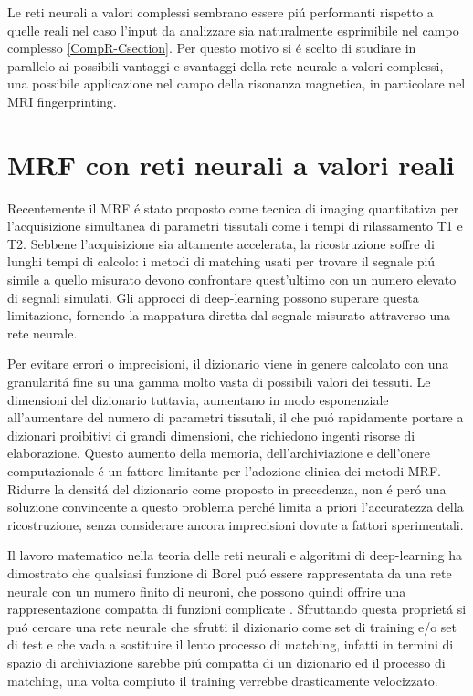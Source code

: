 \documentclass[a4paper,12pt]{report}
\begin{document}
 Le reti neurali a valori complessi sembrano essere pi\'u performanti rispetto a quelle reali nel caso l'input da analizzare sia naturalmente esprimibile nel campo complesso \ref{CompR-Csection}. Per questo motivo si \'e scelto di studiare in parallelo ai possibili vantaggi e svantaggi della rete neurale a valori complessi, una possibile applicazione nel campo della risonanza magnetica, in particolare nel MRI fingerprinting.
 
 \section{MRF con reti neurali a valori reali}
 
 Recentemente il MRF \'e stato proposto come tecnica di imaging quantitativa per l'acquisizione simultanea di parametri tissutali come i tempi di rilassamento T1 e T2. Sebbene l'acquisizione sia altamente accelerata, la ricostruzione soffre di lunghi tempi di calcolo: i metodi di matching usati per trovare il segnale pi\'u simile a quello misurato devono confrontare quest'ultimo con un numero elevato di segnali simulati. Gli approcci di deep-learning possono superare questa limitazione, fornendo la mappatura diretta dal segnale misurato attraverso una rete neurale. 
 
 Per evitare errori o imprecisioni, il dizionario viene in genere calcolato con una granularit\'a fine su una gamma molto vasta di possibili valori dei tessuti. Le dimensioni del dizionario tuttavia, aumentano in modo esponenziale all'aumentare del numero di parametri tissutali, il che pu\'o rapidamente portare a dizionari proibitivi di grandi dimensioni, che richiedono ingenti risorse di elaborazione. Questo aumento della memoria, dell'archiviazione e dell'onere computazionale \'e un fattore limitante per l'adozione clinica dei metodi MRF. Ridurre la densit\'a del dizionario come proposto in precedenza, non \'e per\'o una soluzione convincente a questo problema perch\'e limita a priori l'accuratezza della ricostruzione, senza considerare ancora imprecisioni dovute a fattori sperimentali. 
 
 Il lavoro matematico nella teoria delle reti neurali e algoritmi di deep-learning ha dimostrato che qualsiasi funzione di Borel pu\'o essere rappresentata da una rete neurale con un numero finito di neuroni, che possono quindi offrire una rappresentazione compatta di funzioni complicate \cite{hornik1989multilayer}. Sfruttando questa propriet\'a si pu\'o cercare una rete neurale che sfrutti il dizionario come set di training e/o set di test e che vada a sostituire il lento processo di matching, infatti in termini di spazio di archiviazione sarebbe pi\'u compatta di un dizionario ed il processo di matching, una volta compiuto il training verrebbe drasticamente velocizzato.
 
\end{document}
